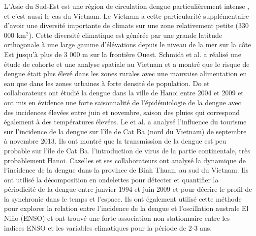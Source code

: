 L'Asie du Sud-Est est une région de circulation dengue particulièrement intense \cite{van2015}, et c'est aussi le cas du Vietnam. Le Vietnam a cette particularité supplémentaire d'avoir une diversité importante de climats sur une zone relativement petite (330 000 km$^2$). Cette diversité climatique est générée par une grande latitude orthogonale à une large gamme d'élévations depuis le niveau de la mer sur la côte Est jusqu'à plus de 3 000 m sur la frontière Ouest. Schmidt et al. \cite{schmidt2011} a réalisé une étude de cohorte et une analyse spatiale au Vietnam et a montré que le risque de dengue était plus élevé dans les zones rurales avec une mauvaise alimentation en eau que dans les zones urbaines à forte densité de population. Do et collaborateurs \cite{hu2013,do2014} ont étudié la dengue dans la ville de Hanoi entre 2004 et 2009 et ont mis en évidence une forte saisonnalité de l'épidémiologie de la dengue avec des incidences élevées entre juin et novembre, saison des pluies qui correspond également à des températures élevées. Le et al. \cite{le2015} a analysé l'influence du tourisme sur l'incidence de la dengue sur l'île de Cat Ba (nord du Vietnam) de septembre à novembre 2013. Ils ont montré que la transmission de la dengue est peu probable sur l'île de Cat Ba. l'introduction de virus de la partie continentale, très probablement Hanoi. Cazelles et ses collaborateurs \cite {thai2010} ont analysé la dynamique de l'incidence de la dengue dans la province de Binh Thuan, au sud du Vietnam. Ils ont utilisé la décomposition en ondelettes pour détecter et quantifier la périodicité de la dengue entre janvier 1994 et juin 2009 et pour décrire le profil de la synchronie dans le temps et l'espace. Ils ont également utilisé cette méthode pour explorer la relation entre l'incidence de la dengue et l'oscillation australe El Ni\~{n}o (ENSO) et ont trouvé une forte association non stationnaire entre les indices ENSO et les variables climatiques pour la période de 2-3 ans.

